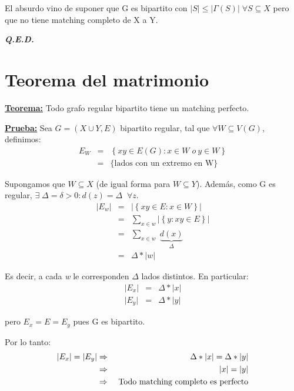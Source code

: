 \documentclass[12pt,a4paper]{report}
\newcommand{\QED}{\hfill \textit{\textbf{Q.E.D.}}}
\begin{document}
			\par El absurdo vino de suponer que G es bipartito con $\lvert S \rvert \leq \lvert \Gamma(S) \rvert \; \forall S \subseteq X$ pero que no tiene matching completo de X a Y.

		\QED

	\section{Teorema del matrimonio}
		\textbf{\underline{Teorema:}} Todo grafo regular bipartito tiene un matching perfecto.

		\textbf{\underline{Prueba:}} Sea $G = (X \cup Y, E)$ bipartito regular, tal que $\forall W \subseteq V(G)$, definimos:
			\begin{eqnarray}
				\nonumber E_{W} &=& \left\lbrace xy \in E(G): x \in W \; o \ y \in W \right\rbrace \\
				\nonumber &=& \lbrace \text{lados con un extremo en W} \rbrace
			\end{eqnarray}

			\par Supongamos que $W \subseteq X$ (de igual forma para $W \subseteq Y$). Además, como G es regular, $\exists \; \Delta  = \delta > 0 : d(z) = \Delta \; \; \forall z$.
			\begin{eqnarray}
				\nonumber \lvert E_{w} \rvert &=& \lvert \left\lbrace xy \in E: x \in W \right\rbrace \rvert \\
				\nonumber &=& \sum_{x \in w} \lvert \left\lbrace y : xy \in E \right\rbrace \rvert \\
				\nonumber &=& \sum_{x \in w} \; \underbrace{d(x)}_{\Delta} \\
				\nonumber &=& \Delta * \lvert w \rvert
			\end{eqnarray}

			\par Es decir, a cada \textit{w} le corresponden $\Delta$ lados distintos. En particular:
			\begin{eqnarray}
				\nonumber \lvert E_{x} \rvert &=& \Delta * \lvert x \rvert \\
				\nonumber \lvert E_{y} \rvert &=& \Delta * \lvert y \rvert
			\end{eqnarray}
			\par pero $E_{x} = E = E_{y}$ pues G es bipartito.

			\vspace{5mm}
			\par Por lo tanto:
			\begin{eqnarray}
				\nonumber \lvert E_{x} \rvert = \lvert E_{y} \rvert &\Rightarrow & \Delta * \lvert x \rvert = \Delta * \lvert y \rvert \\
				\nonumber &\Rightarrow & \lvert x \rvert = \lvert y \rvert \\
				\nonumber &\Rightarrow & \textup{ Todo matching completo es perfecto}
			\end{eqnarray}
\end{document}
